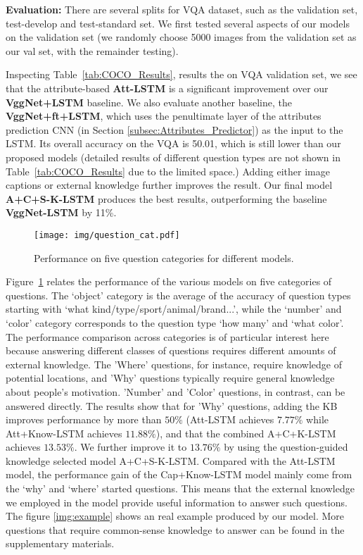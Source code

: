 \documentclass[10pt,journal,compsoc]{IEEEtran}
\begin{document}
\vspace{3pt}
\noindent\textbf{Evaluation:} There are several splits for VQA dataset, such as the validation set, test-develop and test-standard set. We first tested several aspects of our models on the validation set (we randomly choose 5000 images from the validation set as our val set, with the remainder testing). 

Inspecting Table~\ref{tab:COCO_Results}, results the on VQA validation set, we see that the attribute-based \textbf{Att-LSTM} is a significant improvement over our \textbf{VggNet+LSTM} baseline. We also evaluate another baseline, the \textbf{VggNet+ft+LSTM}, which uses the penultimate layer of the attributes prediction CNN (in Section \ref{subsec:Attributes_Predictor}) as the input to the LSTM. Its overall accuracy on the VQA is 50.01, which is still lower than our proposed models (detailed results of different question types are not shown in Table~\ref{tab:COCO_Results} due to the limited space.) Adding either image captions or external knowledge further improves the result. Our final model \textbf{A+C+S-K-LSTM} produces the best results, outperforming the baseline \textbf{VggNet-LSTM} by 11\%. 

\begin{figure}[b!]
\vspace{-10pt}
\begin{center}
   \texttt{[image: img/question\_cat.pdf]}
\end{center}
\vspace{-13pt}
   \caption{Performance on five question categories for different models.}
\label{performance_trend}
\end{figure}

Figure~\ref{performance_trend} relates the performance of the various models on five categories of questions. The `object' category is the average of the accuracy of question types starting with `what kind/type/sport/animal/brand...', while the `number' and `color' category corresponds to the question type `how many' and `what color'. The performance comparison across categories is of particular interest here because answering different classes of questions requires different amounts of external knowledge.  The 'Where' questions, for instance, require knowledge of potential locations, and 'Why' questions typically require general knowledge about people's motivation. 'Number' and 'Color' questions, in contrast, can be answered directly. The results show that for 'Why' questions, adding the KB improves performance by more than $50\%$ (Att-LSTM achieves $7.77\%$ while Att+Know-LSTM achieves $11.88\%$), and that the combined A+C+K-LSTM achieves $13.53\%$. We further improve it to $13.76\%$ by using the question-guided knowledge selected model A+C+S-K-LSTM. Compared with the Att-LSTM model, the performance gain of the Cap+Know-LSTM model mainly come from the `why' and `where' started questions. This means that the external knowledge we employed in the model provide useful information to answer such questions. The figure \ref{img:example} shows an real example produced by our model. More questions that require common-sense knowledge to answer can be found in the supplementary materials.
\end{document}

